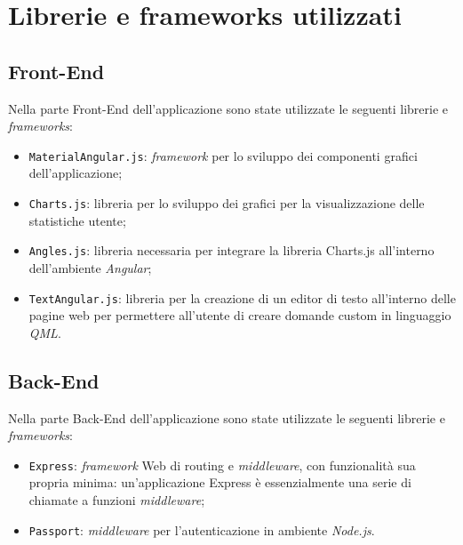 \newpage
\section{Librerie e frameworks utilizzati}
\subsection{Front-End}
Nella parte Front-End dell'applicazione sono state utilizzate le seguenti librerie e \textit{frameworks}:
\begin{itemize}
	\item \texttt{MaterialAngular.js}: \textit{framework} per lo sviluppo dei componenti grafici dell'applicazione;
	\item \texttt{Charts.js}: libreria per lo sviluppo dei grafici per la visualizzazione delle statistiche
	utente;
	\item \texttt{Angles.js}: libreria necessaria per integrare la libreria Charts.js all'interno
	dell'ambiente \textit{Angular};
	\item \texttt{TextAngular.js}: libreria per la creazione di un editor di testo all'interno delle pagine web per permettere all'utente di creare domande custom in linguaggio \textit{QML}.
\end{itemize}
\subsection{Back-End}
Nella parte Back-End dell'applicazione sono state utilizzate le seguenti librerie e \textit{frameworks}:
\begin{itemize}
	\item \texttt{Express}: \textit{framework} Web di routing e \textit{middleware}, con funzionalità sua propria minima: un'applicazione Express è essenzialmente una serie di chiamate a funzioni \textit{middleware};
	\item \texttt{Passport}: \textit{middleware} per l'autenticazione in ambiente \textit{Node.js}.
\end{itemize}

